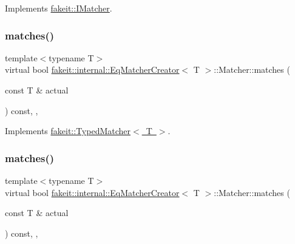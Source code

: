 Implements \mbox{\hyperlink{structfakeit_1_1IMatcher_a409d414a042236dc5e05e241dfd24a67}{fakeit\+::\+I\+Matcher}}.

\mbox{\label{structfakeit_1_1internal_1_1EqMatcherCreator_1_1Matcher_a777fef5dafff87f2e8cb7a0201a9bc78}} 
\subsubsection{\texorpdfstring{matches()}{matches()}\hspace{0.1cm}{\footnotesize\ttfamily [1/9]}}
{\footnotesize\ttfamily template$<$typename T$>$ \\
virtual bool \mbox{\hyperlink{structfakeit_1_1internal_1_1EqMatcherCreator}{fakeit\+::internal\+::\+Eq\+Matcher\+Creator}}$<$ T $>$\+::Matcher\+::matches (\begin{DoxyParamCaption}\item[{const T \&}]{actual }\end{DoxyParamCaption}) const\hspace{0.3cm}{\ttfamily [inline]}, {\ttfamily [override]}, {\ttfamily [virtual]}}



Implements \mbox{\hyperlink{structfakeit_1_1TypedMatcher_ac553bb6ac7c98a489c92fa6ace0f2e2b}{fakeit\+::\+Typed\+Matcher$<$ T $>$}}.

\mbox{\label{structfakeit_1_1internal_1_1EqMatcherCreator_1_1Matcher_a777fef5dafff87f2e8cb7a0201a9bc78}} 
\subsubsection{\texorpdfstring{matches()}{matches()}\hspace{0.1cm}{\footnotesize\ttfamily [2/9]}}
{\footnotesize\ttfamily template$<$typename T$>$ \\
virtual bool \mbox{\hyperlink{structfakeit_1_1internal_1_1EqMatcherCreator}{fakeit\+::internal\+::\+Eq\+Matcher\+Creator}}$<$ T $>$\+::Matcher\+::matches (\begin{DoxyParamCaption}\item[{const T \&}]{actual }\end{DoxyParamCaption}) const\hspace{0.3cm}{\ttfamily [inline]}, {\ttfamily [override]}, {\ttfamily [virtual]}}



